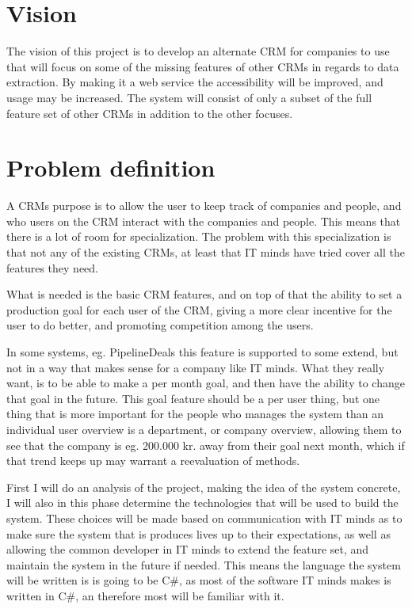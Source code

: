 \section{Vision}
\label{sec:Vision}
The vision of this project is to develop an alternate CRM for companies to use
that will focus on some of the missing features of other CRMs in regards to data
extraction. By making it a web service the accessibility will be improved, and
usage may be increased. The system will consist of only a subset of the full
feature set of other CRMs in addition to the other focuses. 

\section{Problem definition}
\label{sec:Problem definition}
A CRMs purpose is to allow the user to keep track of companies and people, and
who users on the CRM interact with the companies and people. This means that
there is a lot of room for specialization. The problem with this specialization
is that not any of the existing CRMs, at least that IT minds have tried cover
all the features they need. 

What is needed is the basic CRM features, and on top of that the ability to set
a production goal for each user of the CRM, giving a more clear incentive for
the user to do better, and promoting competition among the users. 

In some systems, eg. PipelineDeals\cite{pipelinedeals:features} this feature is
supported to some extend, but not in a way that makes sense for a company like
IT minds. What they really want, is to be able to make a per month goal, and
then have the ability to change that goal in the future. This goal feature
should be a per user thing, but one thing that is more important for the people
who manages the system than an individual user overview is a department, or
company overview, allowing them to see that the company is eg. 200.000 kr. away
from their goal next month, which if that trend keeps up may warrant a
reevaluation of methods. 

First I will do an analysis of the project, making the idea of the system
concrete, I will also in this phase determine the technologies that will be used
to build the system. These choices will be made based on communication with IT
minds as to make sure the system that is produces lives up to their
expectations, as well as allowing the common developer in IT minds to extend the
feature set, and maintain the system in the future if needed. This means the
language the system will be written is is going to be C\#, as most of the
software IT minds makes is written in C\#, an therefore most will be familiar
with it. 

